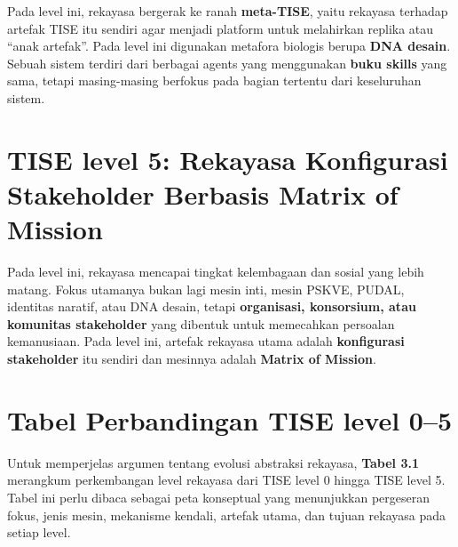 \documentclass[
  letterpaper,
  DIV=11,
  numbers=noendperiod]{scrreprt}
\begin{document}

Pada level ini, rekayasa bergerak ke ranah \textbf{meta-TISE}, yaitu
rekayasa terhadap artefak TISE itu sendiri agar menjadi platform untuk
melahirkan replika atau ``anak artefak''. Pada level ini digunakan
metafora biologis berupa \textbf{DNA desain}. Sebuah sistem terdiri dari
berbagai agents yang menggunakan \textbf{buku skills} yang sama, tetapi
masing-masing berfokus pada bagian tertentu dari keseluruhan sistem.

\section*{TISE level 5: Rekayasa Konfigurasi Stakeholder Berbasis Matrix
of
Mission}\label{tise-level-5-rekayasa-konfigurasi-stakeholder-berbasis-matrix-of-mission}


Pada level ini, rekayasa mencapai tingkat kelembagaan dan sosial yang
lebih matang. Fokus utamanya bukan lagi mesin inti, mesin PSKVE, PUDAL,
identitas naratif, atau DNA desain, tetapi \textbf{organisasi,
konsorsium, atau komunitas stakeholder} yang dibentuk untuk memecahkan
persoalan kemanusiaan. Pada level ini, artefak rekayasa utama adalah
\textbf{konfigurasi stakeholder} itu sendiri dan mesinnya adalah
\textbf{Matrix of Mission}.

\section*{Tabel Perbandingan TISE level
0--5}\label{tabel-perbandingan-tise-level-05}


Untuk memperjelas argumen tentang evolusi abstraksi rekayasa,
\textbf{Tabel 3.1} merangkum perkembangan level rekayasa dari TISE level
0 hingga TISE level 5. Tabel ini perlu dibaca sebagai peta konseptual
yang menunjukkan pergeseran fokus, jenis mesin, mekanisme kendali,
artefak utama, dan tujuan rekayasa pada setiap level.
\end{document}
